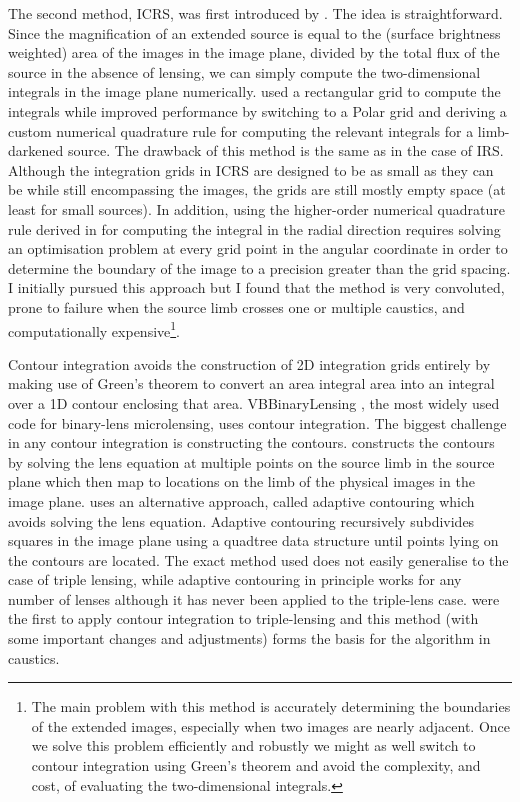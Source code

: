 \documentclass[12pt,dvipsnames]{report}
\newcommand{\ssf}[1]{\textsf{#1}}
\begin{document}
The second method, ICRS, was first introduced by \citet{1996ApJ...472..660B}.
The idea is straightforward. Since the magnification of an extended
source is equal to the (surface brightness weighted) area of the images in
the image plane, divided by the total flux of the source in the absence of
lensing, we can simply compute the two-dimensional integrals in the image plane
numerically. \citet{1996ApJ...472..660B} used a rectangular grid to compute the
integrals while \citet{2010ApJ...716.1408B} improved performance by switching
to a Polar grid and deriving a custom numerical quadrature rule for computing
the relevant integrals for a limb-darkened source. The drawback of this method
is the same as in the case of IRS. Although the integration grids in ICRS are
designed to be as small as they can be while still encompassing the images,
the grids are still mostly empty space (at least for small sources).
In addition, using the higher-order numerical quadrature rule derived in
\citet{2010ApJ...716.1408B} for computing the integral in the radial direction
requires solving an optimisation problem at every grid point in the angular
coordinate in order to determine the boundary of the image to a precision
greater than the grid spacing. 
I initially pursued this approach but I found that the
method is very convoluted, prone to failure when the source limb crosses one or
multiple caustics, and computationally expensive\footnote{The main problem with
    this method is accurately determining the boundaries of the extended images,
    especially when two images are nearly adjacent. Once we solve this problem
    efficiently and robustly we might as well switch to contour integration using
    Green's theorem and avoid the complexity, and cost, of evaluating the two-dimensional
    integrals.}.

Contour integration avoids the construction of 2D integration
grids entirely by making use of Green's theorem to convert an area integral
area into an integral over a 1D contour enclosing that area.  \ssf{VBBinaryLensing}
\citep{2010MNRAS.408.2188B}, the most widely used code for binary-lens microlensing,
uses contour integration. 
The biggest challenge in  any contour integration is constructing the contours.
\citep{2010MNRAS.408.2188B} constructs the contours by solving the lens
equation at multiple points on the source limb in the source plane which then
map to locations on the limb of the physical images in the image plane.
\citet{2007MNRAS.377.1679D} uses an alternative approach, called \ssf{adaptive
    contouring} which avoids solving the lens equation. Adaptive contouring
recursively subdivides squares in the image plane using a \ssf{quadtree} data
structure until points lying on the contours are located. The exact method used
\citep{2010MNRAS.408.2188B} does not easily generalise to the case of triple
lensing, while adaptive contouring in principle works for any number of lenses
although it has never been applied to the triple-lens case.
\citet{2021MNRAS.503.6143K} were the first to apply contour integration to
triple-lensing and this method (with some important changes and adjustments)
forms the basis for the algorithm in \ssf{caustics}.
\end{document}
